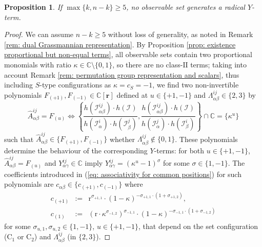 \documentclass[10pt]{article}
\newtheorem{prop}{Proposition}%
\theoremstyle{remark}%
\theoremstyle{definition}%
\begin{document}
\begin{prop}
\label{prop: bound number of radicals}
If $\max\{k,n-k\}\geq 5$, no observable set generates a radical $Y$-term. 
\end{prop}
\begin{proof}
We can assume $n-k\geq5$ without loss of generality, as noted in Remark \ref{rem: dual Grassmannian representation}. By Proposition \ref{prop: existence proportional but non-equal terms}, all observable sets contain two proportional monomials with ratio $\kappa\in\mathbb{C}\setminus\{0,1\}$, so there are no class-$\mathrm{II}$ terms; taking into account Remark \ref{rem: permutation group representation and scalars}, thus including $S$-type configurations as $\kappa=c_{S}=-1$, we find two non-invertible polynomials $F_{(+1)},F_{(-1)}\in\mathbb{C}[\mathbf{r}]$ defined at $u\in\{+1,-1\}$ and $\Lambda_{\alpha\beta}^{ij}\in\{2,3\}$ by 
\begin{equation}
   \hat{A}_{\alpha\beta}^{ij}=F_{(u)}\Leftrightarrow \left\{\frac{h(\mathcal{I}_{\alpha\beta}^{ij})\cdot h(\mathcal{I})}{h(\mathcal{I}_{\alpha}^{i})\cdot h(\mathcal{I}_{\beta}^{j})},\frac{h(\mathcal{I}_{\alpha\beta}^{ij})\cdot h(\mathcal{I})}{h(\mathcal{I}_{\alpha}^{j})\cdot h(\mathcal{I}_{\beta}^{i})}\right \}\cap\mathbb{C}=\{\kappa^{u}\}
\end{equation}
such that $\hat{A}_{\alpha\beta}^{ij}\in\{F_{(+1)},F_{(-1)}\}$ whether $\Lambda_{\alpha\beta}^{ij}\notin\{0,1\}$. 
These polynomials determine the behaviour of the corresponding $Y$-terms: for both $u\in\{+1,-1\}$, $\hat{A}_{\alpha\beta}^{ij}=F_{(u)}$ and $Y_{\alpha\gamma}^{ij}\in\mathbb{C}$ imply $Y_{\alpha\gamma}^{ij}=(\kappa^{u}-1)^{\sigma}$ for some $\sigma\in\{1,-1\}$. The coefficients introduced in (\ref{eq: associativity for common positions}) for such polynomials are $c_{\alpha\beta}\in\{c_{(+1)},c_{(-1)}\}$ where 
\begin{eqnarray}
c_{(+1)} & := & \mathrm{r}^{\sigma_{+1,1}}\cdot(1-\kappa)^{-\sigma_{+1,1}\cdot(1+\sigma_{+1,2})},\nonumber \\
c_{(1)} & := & (\mathrm{r}\cdot\kappa^{\sigma_{-1,2}})^{\sigma_{-1,1}}\cdot(1-\kappa)^{-\sigma_{-1,1}\cdot(1+\sigma_{-1,2})} 
\label{eq: coefficients for non-centered}
\end{eqnarray}
for some $\sigma_{u,1},\sigma_{u,2}\in\{1,-1\}$, $u\in\{+1,-1\}$, that depend on the set configuration ($\mathrm{C}_{1}$ or $\mathrm{C}_{2}$) and $\Lambda_{\alpha\beta}^{ij}$ (in $\{2,3\}$). 


\end{proof}
\end{document}
